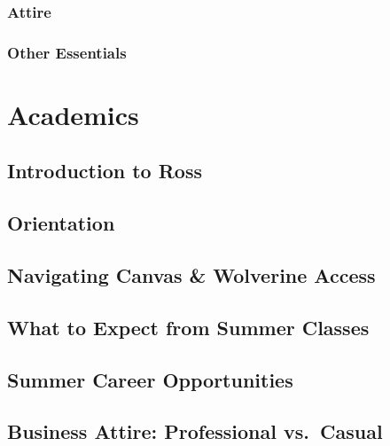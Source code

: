 \documentclass[
]{book}
\begin{document}
\hypertarget{attire}{%
\subsection{Attire}\label{attire}}

\hypertarget{other-essentials}{%
\subsection{Other Essentials}\label{other-essentials}}

\hypertarget{academics}{%
\chapter{Academics}\label{academics}}

\hypertarget{introduction-to-ross}{%
\section{Introduction to Ross}\label{introduction-to-ross}}

\hypertarget{orientation}{%
\section{Orientation}\label{orientation}}

\hypertarget{navigating-canvas-wolverine-access}{%
\section{Navigating Canvas \& Wolverine Access}\label{navigating-canvas-wolverine-access}}

\hypertarget{what-to-expect-from-summer-classes}{%
\section{What to Expect from Summer Classes}\label{what-to-expect-from-summer-classes}}

\hypertarget{summer-career-opportunities}{%
\section{Summer Career Opportunities}\label{summer-career-opportunities}}

\hypertarget{business-attire-professional-vs.-casual}{%
\section{Business Attire: Professional vs.~Casual}\label{business-attire-professional-vs.-casual}}
\end{document}
